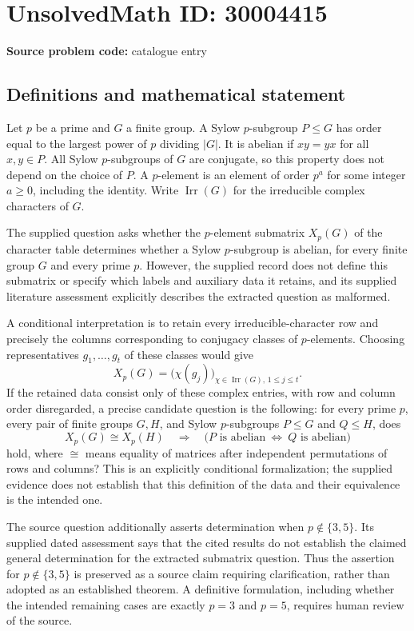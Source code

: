 \documentclass[11pt]{article}
\begin{document}
\section*{UnsolvedMath ID: 30004415}
\textbf{Source problem code:} catalogue entry
\subsection{Definitions and mathematical statement}
Let \(p\) be a prime and \(G\) a finite group. A Sylow \(p\)-subgroup \(P\leq G\) has order equal to the largest power of \(p\) dividing \(|G|\). It is abelian if \(xy=yx\) for all \(x,y\in P\). All Sylow \(p\)-subgroups of \(G\) are conjugate, so this property does not depend on the choice of \(P\). A \(p\)-element is an element of order \(p^a\) for some integer \(a\geq0\), including the identity. Write \(\operatorname{Irr}(G)\) for the irreducible complex characters of \(G\).

The supplied question asks whether the \(p\)-element submatrix \(X_p(G)\) of the character table determines whether a Sylow \(p\)-subgroup is abelian, for every finite group \(G\) and every prime \(p\). However, the supplied record does not define this submatrix or specify which labels and auxiliary data it retains, and its supplied literature assessment explicitly describes the extracted question as malformed.

A conditional interpretation is to retain every irreducible-character row and precisely the columns corresponding to conjugacy classes of \(p\)-elements. Choosing representatives \(g_1,\ldots,g_t\) of these classes would give
\[
X_p(G)=\bigl(\chi(g_j)\bigr)_{\chi\in\operatorname{Irr}(G),\,1\leq j\leq t}.
\]
If the retained data consist only of these complex entries, with row and column order disregarded, a precise candidate question is the following: for every prime \(p\), every pair of finite groups \(G,H\), and Sylow \(p\)-subgroups \(P\leq G\) and \(Q\leq H\), does
\[
X_p(G)\cong X_p(H)
\quad\Longrightarrow\quad
\bigl(P\text{ is abelian}\ \Longleftrightarrow\ Q\text{ is abelian}\bigr)
\]
hold, where \(\cong\) means equality of matrices after independent permutations of rows and columns? This is an explicitly conditional formalization; the supplied evidence does not establish that this definition of the data and their equivalence is the intended one.

The source question additionally asserts determination when \(p\notin\{3,5\}\). Its supplied dated assessment says that the cited results do not establish the claimed general determination for the extracted submatrix question. Thus the assertion for \(p\notin\{3,5\}\) is preserved as a source claim requiring clarification, rather than adopted as an established theorem. A definitive formulation, including whether the intended remaining cases are exactly \(p=3\) and \(p=5\), requires human review of the source.
\end{document}
